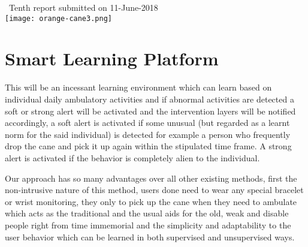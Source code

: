 \documentclass[a4paper, parskip=full]{scrartcl}
\begin{document}
\begin{titlepage}
	
	
	{\large \ Tenth report submitted on 11-June-2018}\\[0.2cm] %
	
	
	\texttt{[image: orange-cane3.png]}\\[0.2cm] %
	
	
	\vfill %
	
\end{titlepage}







 \section*{Smart Learning Platform}
 
 This will be an incessant learning environment which can learn based on individual daily ambulatory activities and if abnormal activities are detected a soft or strong alert will be activated and the intervention layers will be notified accordingly, a soft alert is activated if some unusual (but regarded as a learnt norm for the said individual) is detected for example a person who frequently drop the cane and pick it up again within the stipulated time frame. A strong alert is activated if the behavior is completely alien to the individual.

Our approach has so many advantages over all other existing methods, first the non-intrusive nature of this method, users done need to wear any special bracelet or wrist monitoring, they only to pick up the cane when they need to ambulate which acts as the traditional and the usual aids for the old, weak and disable people right from time immemorial and the simplicity and adaptability to the user behavior which can be learned in both supervised and unsupervised ways.
\end{document}
